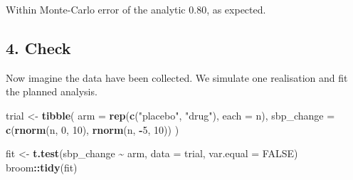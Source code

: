 \documentclass[
]{article}
\newenvironment{Shaded}{\begin{snugshade}}{\end{snugshade}}
\newcommand{\AttributeTok}[1]{\textcolor[rgb]{0.13,0.29,0.53}{#1}}
\newcommand{\ConstantTok}[1]{\textcolor[rgb]{0.56,0.35,0.01}{#1}}
\newcommand{\ControlFlowTok}[1]{\textcolor[rgb]{0.13,0.29,0.53}{\textbf{#1}}}
\newcommand{\DecValTok}[1]{\textcolor[rgb]{0.00,0.00,0.81}{#1}}
\newcommand{\ErrorTok}[1]{\textcolor[rgb]{0.64,0.00,0.00}{\textbf{#1}}}
\newcommand{\FloatTok}[1]{\textcolor[rgb]{0.00,0.00,0.81}{#1}}
\newcommand{\FunctionTok}[1]{\textcolor[rgb]{0.13,0.29,0.53}{\textbf{#1}}}
\newcommand{\NormalTok}[1]{#1}
\newcommand{\OtherTok}[1]{\textcolor[rgb]{0.56,0.35,0.01}{#1}}
\newcommand{\SpecialCharTok}[1]{\textcolor[rgb]{0.81,0.36,0.00}{\textbf{#1}}}
\newcommand{\StringTok}[1]{\textcolor[rgb]{0.31,0.60,0.02}{#1}}
\begin{document}
\begin{Shaded}
\end{Shaded}

Within Monte-Carlo error of the analytic 0.80, as expected.

\subsection{4. Check}\label{check}

Now imagine the data have been collected. We simulate one realisation
and fit the planned analysis.

\begin{Shaded}
\begin{Highlighting}[]
\NormalTok{trial }\OtherTok{\textless{}{-}} \FunctionTok{tibble}\NormalTok{(}
  \AttributeTok{arm =} \FunctionTok{rep}\NormalTok{(}\FunctionTok{c}\NormalTok{(}\StringTok{"placebo"}\NormalTok{, }\StringTok{"drug"}\NormalTok{), }\AttributeTok{each =}\NormalTok{ n),}
  \AttributeTok{sbp\_change =} \FunctionTok{c}\NormalTok{(}\FunctionTok{rnorm}\NormalTok{(n, }\DecValTok{0}\NormalTok{, }\DecValTok{10}\NormalTok{), }\FunctionTok{rnorm}\NormalTok{(n, }\SpecialCharTok{{-}}\DecValTok{5}\NormalTok{, }\DecValTok{10}\NormalTok{))}
\NormalTok{)}

\NormalTok{fit }\OtherTok{\textless{}{-}} \FunctionTok{t.test}\NormalTok{(sbp\_change }\SpecialCharTok{\textasciitilde{}}\NormalTok{ arm, }\AttributeTok{data =}\NormalTok{ trial, }\AttributeTok{var.equal =} \ConstantTok{FALSE}\NormalTok{)}
\NormalTok{broom}\SpecialCharTok{::}\FunctionTok{tidy}\NormalTok{(fit)}
\end{Highlighting}
\end{Shaded}
\end{document}
